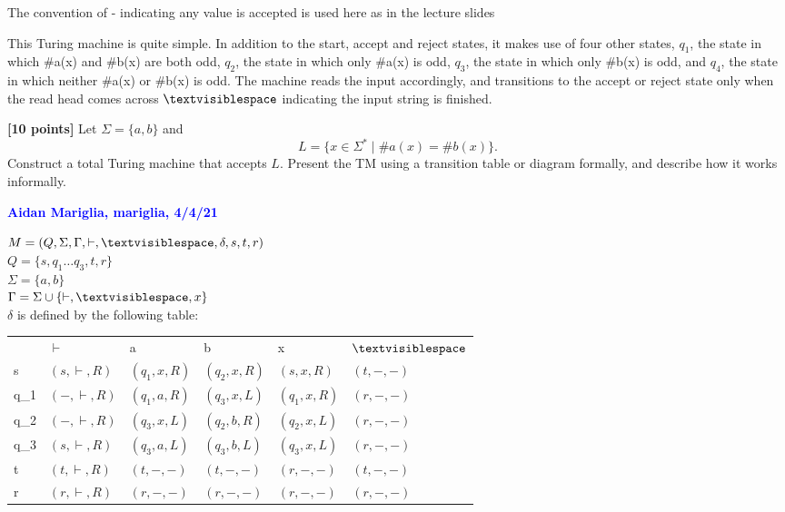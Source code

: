 \documentclass[11pt,fleqn]{article}
\newcommand{\set}[1]{{\{ #1 \}}}
\begin{document}
  The convention of - indicating any value is accepted is used here as in the lecture slides \medskip
  
  This Turing machine is quite simple. In addition to the start, accept and reject
  states, it makes use of four other states, $q_1$, the state in which \#a(x) and
  \#b(x) are both odd, $q_2$, the state in which only \#a(x) is odd, $q_3$, the
  state in which only \#b(x) is odd, and $q_4$, the state in which neither \#a(x)
  or \#b(x) is odd. The machine reads the input accordingly, and transitions to
  the accept or reject state only when the read head comes across $\textvisiblespace$
  indicating the input string is finished.



  \item \textbf{[10 points]} Let $\Sigma = \set{a,b}$ and \[L = \set{x
    \in \Sigma^* \mid \#a(x) = \#b(x)}.\] Construct a total Turing
    machine that accepts $L$.  Present the TM using a transition table
    or diagram formally, and describe how it works informally.

  \bigskip

  \textcolor{blue}{\textbf{Aidan Mariglia, mariglia, 4/4/21}}
  
  $M = (Q, \Sigma, \Gamma, \vdash, \textvisiblespace, \delta, s, t, r)$\\
  $Q = \{s, q_1 \dots q_3, t, r \}$\\
  $\Sigma = \{a,b\}$\\
  $\Gamma = \Sigma \cup \{\vdash, \textvisiblespace, x \}$\\
  $\delta$ is defined by the following table:\\

  \begin{table}[h]
    \centering
    \begin{tabular}{llllll}
         & $\vdash$         & a             & b             & x           & $\textvisiblespace$ \\
    s    & $(s, \vdash, R)$ & $(q_1, x, R)$ & $(q_2, x, R)$ & $(s,x,R)$   & $(t, -, -)$         \\
    q\_1 & $(-, \vdash, R)$ & $(q_1, a, R)$ & $(q_3, x, L)$ & $(q_1,x,R)$ & $(r, -, -)$         \\
    q\_2 & $(-, \vdash, R)$ & $(q_3, x, L)$ & $(q_2, b, R)$ & $(q_2,x,L)$ & $(r, -, -)$         \\
    q\_3 & $(s, \vdash, R)$ & $(q_3, a, L)$ & $(q_3, b, L)$ & $(q_3,x,L)$ & $(r, -, -)$         \\
    t    & $(t, \vdash, R)$ & $(t, -, -)$   & $(t, -, -)$   & $(r,-,-)$   & $(t, -, -)$         \\
    r    & $(r, \vdash, R)$ & $(r, -, -)$   & $(r, -, -)$   & $(r,-,-)$   & $(r, -, -)$        
    \end{tabular}
  \end{table}
\end{document}
